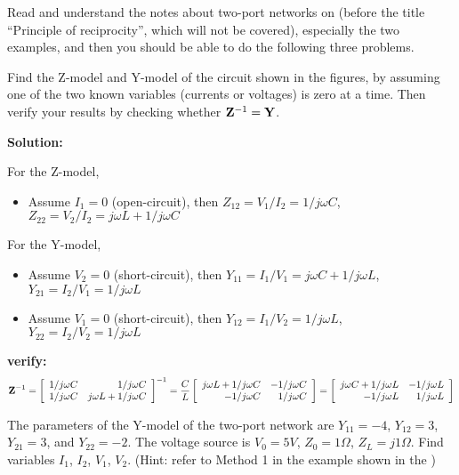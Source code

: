 \item Read and understand the notes about two-port networks on 
(before the title ``Principle of reciprocity'', which will not be covered), especially
the two examples, and then you should be able to do the following three problems.

Find the Z-model and Y-model of the circuit shown in the figures, by
assuming one of the two known variables (currents or voltages) is zero at
a time. Then verify your results by checking whether ${\bf Z}^{-1}={\bf Y}$.


  {\bf Solution:}

  For the Z-model, 
  \begin{itemize}
  item Assume $I_2=0$ (open-circuit), then
  	$Z_{11}=V_1/I_1=1/j\omega C$, $Z_{21}=V_2/I_1=1/j\omega C$
  \item Assume $I_1=0$ (open-circuit), then
  	$Z_{12}=V_1/I_2=1/j\omega C$, $Z_{22}=V_2/I_2=j\omega L+1/j\omega C$
  \end{itemize}
  For the Y-model, 
  \begin{itemize}
  \item Assume $V_2=0$ (short-circuit), then
  	$Y_{11}=I_1/V_1=j\omega C+1/j\omega L$, $Y_{21}=I_2/V_1=1/j\omega L$
  \item Assume $V_1=0$ (short-circuit), then
  	$Y_{12}=I_1/V_2=1/j\omega L$, $Y_{22}=I_2/V_2=1/j\omega L$
  \end{itemize}
  {\bf verify:}
  \[ {\bf Z}^{-1}=\left[ \begin{array}{rr} 1/j\omega C & 1/j\omega C \\
  	1/j\omega C & j\omega L+1/j\omega C \end{array} \right]^{-1}
  	=\frac{C}{L}\left[ \begin{array}{rr} j\omega L+1/j\omega C & -1/j\omega C \\
  	-1/j\omega C & 1/j\omega C \end{array} \right]
  	=\left[ \begin{array}{rr} j\omega C+1/j\omega L & -1/j\omega L \\
  	-1/j\omega L & 1/j\omega L \end{array} \right]
  \]


\item The parameters of the Y-model of the two-port network are $Y_{11}=-4$, 
$Y_{12}=3$, $Y_{21}=3$, and $Y_{22}=-2$. The voltage source is $V_0=5V$, 
$Z_0=1\Omega$, $Z_L=j1\Omega$. Find variables $I_1$, $I_2$, $V_1$, $V_2$. 
(Hint: refer to Method 1 in the example shown in the
)

